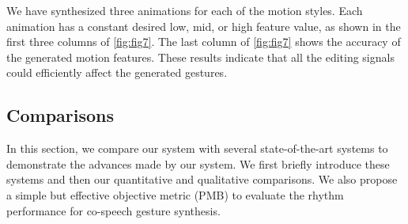 We have synthesized three animations for each of the motion styles. Each animation has a constant desired low, mid, or high feature value, as shown in the first three columns of \fig\ref{fig:fig7}. The last column of \fig\ref{fig:fig7} shows the accuracy of the generated motion features. These results indicate that all the editing signals could efficiently affect the generated gestures.

\subsection{Comparisons}
\label{sbusec:comparisons}
In this section, we compare our system with several state-of-the-art systems to demonstrate the advances made by our system. We first briefly introduce these systems and then our quantitative and qualitative comparisons. We also propose a simple but effective objective metric (PMB) to evaluate the rhythm performance for co-speech gesture synthesis.

